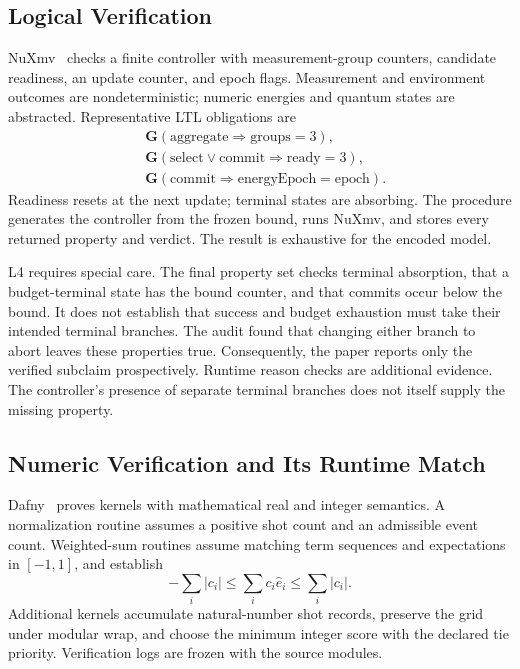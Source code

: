 \documentclass[conference]{IEEEtran}
\begin{document}
\subsection{Logical Verification}
NuXmv~\cite{nuxmv} checks a finite controller with measurement-group counters, candidate readiness, an update counter, and epoch flags. Measurement and environment outcomes are nondeterministic; numeric energies and quantum states are abstracted. Representative LTL obligations are
\begin{align}
 &\mathbf G(\mathrm{aggregate}\Rightarrow\mathrm{groups}=3),\nonumber\\
 &\mathbf G(\mathrm{select}\lor\mathrm{commit}\Rightarrow\mathrm{ready}=3),\nonumber\\
 &\mathbf G(\mathrm{commit}\Rightarrow\mathrm{energyEpoch}=\mathrm{epoch}).
 \label{eq:logical}
\end{align}
Readiness resets at the next update; terminal states are absorbing. The procedure generates the controller from the frozen bound, runs NuXmv, and stores every returned property and verdict. The result is exhaustive for the encoded model.

L4 requires special care. The final property set checks terminal absorption, that a budget-terminal state has the bound counter, and that commits occur below the bound. It does not establish that success and budget exhaustion must take their intended terminal branches. The audit found that changing either branch to abort leaves these properties true. Consequently, the paper reports only the verified subclaim prospectively. Runtime reason checks are additional evidence. The controller's presence of separate terminal branches does not itself supply the missing property.

\subsection{Numeric Verification and Its Runtime Match}
\label{sec:numeric}
Dafny~\cite{dafny} proves kernels with mathematical real and integer semantics. A normalization routine assumes a positive shot count and an admissible event count. Weighted-sum routines assume matching term sequences and expectations in $[-1,1]$, and establish
\begin{equation}
 -\sum_i|c_i|\leq\sum_i c_i\hat e_i\leq\sum_i|c_i|.
 \label{eq:numericbound}
\end{equation}
Additional kernels accumulate natural-number shot records, preserve the grid under modular wrap, and choose the minimum integer score with the declared tie priority. Verification logs are frozen with the source modules.
\end{document}
